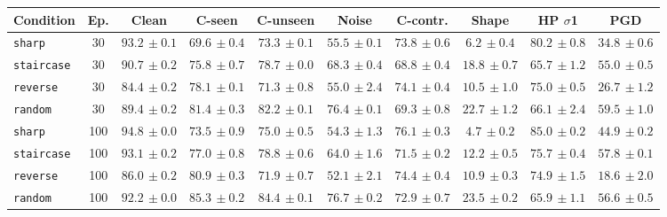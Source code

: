 \begin{tabular}{lccccccccc}
\hline
Condition & Ep. & Clean & C-seen & C-unseen & Noise & C-contr. & Shape & HP $\sigma$1 & PGD \\
\hline
\texttt{sharp} & 30 & $93.2{\scriptstyle\,\pm0.1}$ & $69.6{\scriptstyle\,\pm0.4}$ & $73.3{\scriptstyle\,\pm0.1}$ & $55.5{\scriptstyle\,\pm0.1}$ & $73.8{\scriptstyle\,\pm0.6}$ & $6.2{\scriptstyle\,\pm0.4}$ & $80.2{\scriptstyle\,\pm0.8}$ & $34.8{\scriptstyle\,\pm0.6}$ \\
\texttt{staircase} & 30 & $90.7{\scriptstyle\,\pm0.2}$ & $75.8{\scriptstyle\,\pm0.7}$ & $78.7{\scriptstyle\,\pm0.0}$ & $68.3{\scriptstyle\,\pm0.4}$ & $68.8{\scriptstyle\,\pm0.4}$ & $18.8{\scriptstyle\,\pm0.7}$ & $65.7{\scriptstyle\,\pm1.2}$ & $55.0{\scriptstyle\,\pm0.5}$ \\
\texttt{reverse} & 30 & $84.4{\scriptstyle\,\pm0.2}$ & $78.1{\scriptstyle\,\pm0.1}$ & $71.3{\scriptstyle\,\pm0.8}$ & $55.0{\scriptstyle\,\pm2.4}$ & $74.1{\scriptstyle\,\pm0.4}$ & $10.5{\scriptstyle\,\pm1.0}$ & $75.0{\scriptstyle\,\pm0.5}$ & $26.7{\scriptstyle\,\pm1.2}$ \\
\texttt{random} & 30 & $89.4{\scriptstyle\,\pm0.2}$ & $81.4{\scriptstyle\,\pm0.3}$ & $82.2{\scriptstyle\,\pm0.1}$ & $76.4{\scriptstyle\,\pm0.1}$ & $69.3{\scriptstyle\,\pm0.8}$ & $22.7{\scriptstyle\,\pm1.2}$ & $66.1{\scriptstyle\,\pm2.4}$ & $59.5{\scriptstyle\,\pm1.0}$ \\
\texttt{sharp} & 100 & $94.8{\scriptstyle\,\pm0.0}$ & $73.5{\scriptstyle\,\pm0.9}$ & $75.0{\scriptstyle\,\pm0.5}$ & $54.3{\scriptstyle\,\pm1.3}$ & $76.1{\scriptstyle\,\pm0.3}$ & $4.7{\scriptstyle\,\pm0.2}$ & $85.0{\scriptstyle\,\pm0.2}$ & $44.9{\scriptstyle\,\pm0.2}$ \\
\texttt{staircase} & 100 & $93.1{\scriptstyle\,\pm0.2}$ & $77.0{\scriptstyle\,\pm0.8}$ & $78.8{\scriptstyle\,\pm0.6}$ & $64.0{\scriptstyle\,\pm1.6}$ & $71.5{\scriptstyle\,\pm0.2}$ & $12.2{\scriptstyle\,\pm0.5}$ & $75.7{\scriptstyle\,\pm0.4}$ & $57.8{\scriptstyle\,\pm0.1}$ \\
\texttt{reverse} & 100 & $86.0{\scriptstyle\,\pm0.2}$ & $80.9{\scriptstyle\,\pm0.3}$ & $71.9{\scriptstyle\,\pm0.7}$ & $52.1{\scriptstyle\,\pm2.1}$ & $74.4{\scriptstyle\,\pm0.4}$ & $10.9{\scriptstyle\,\pm0.3}$ & $74.9{\scriptstyle\,\pm1.5}$ & $18.6{\scriptstyle\,\pm2.0}$ \\
\texttt{random} & 100 & $92.2{\scriptstyle\,\pm0.0}$ & $85.3{\scriptstyle\,\pm0.2}$ & $84.4{\scriptstyle\,\pm0.1}$ & $76.7{\scriptstyle\,\pm0.2}$ & $72.9{\scriptstyle\,\pm0.7}$ & $23.5{\scriptstyle\,\pm0.2}$ & $65.9{\scriptstyle\,\pm1.1}$ & $56.6{\scriptstyle\,\pm0.5}$ \\
\hline
\end{tabular}

